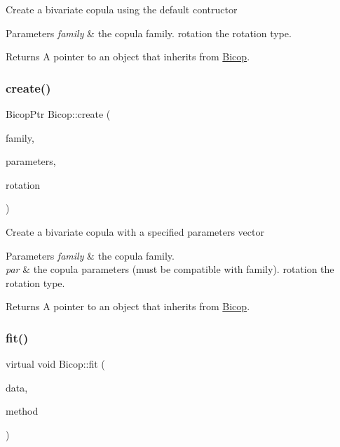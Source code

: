 Create a bivariate copula using the default contructor


\begin{DoxyParams}{Parameters}
{\em family} & the copula family.  rotation the rotation type. \\
\hline
\end{DoxyParams}
\begin{DoxyReturn}{Returns}
A pointer to an object that inherits from {\ttfamily \hyperlink{class_bicop}{Bicop}}. 
\end{DoxyReturn}
\mbox{\label{class_bicop_a4bfa38e69a96cc8a7c689e1161942e46}} 
\subsubsection{\texorpdfstring{create()}{create()}\hspace{0.1cm}{\footnotesize\ttfamily [2/2]}}
{\footnotesize\ttfamily Bicop\+Ptr Bicop\+::create (\begin{DoxyParamCaption}\item[{const int \&}]{family,  }\item[{const Vec\+Xd \&}]{parameters,  }\item[{const int \&}]{rotation }\end{DoxyParamCaption})\hspace{0.3cm}{\ttfamily [static]}}

Create a bivariate copula with a specified parameters vector


\begin{DoxyParams}{Parameters}
{\em family} & the copula family. \\
\hline
{\em par} & the copula parameters (must be compatible with family).  rotation the rotation type. \\
\hline
\end{DoxyParams}
\begin{DoxyReturn}{Returns}
A pointer to an object that inherits from {\ttfamily \hyperlink{class_bicop}{Bicop}}. 
\end{DoxyReturn}
\mbox{\label{class_bicop_a0ff40d8054e11ed8aaa4956c7fd84e89}} 
\subsubsection{\texorpdfstring{fit()}{fit()}}
{\footnotesize\ttfamily virtual void Bicop\+::fit (\begin{DoxyParamCaption}\item[{const Mat\+Xd \&}]{data,  }\item[{std\+::string}]{method }\end{DoxyParamCaption})\hspace{0.3cm}{\ttfamily [pure virtual]}}

